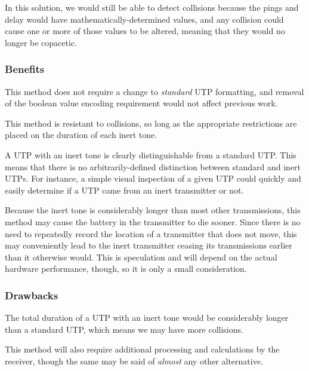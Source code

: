 \documentclass[12pt]{article}
\begin{document}
In this solution, we would still be able to detect collisions because the
pings and delay would have mathematically-determined values, and any collision
could cause one or more of those values to be altered, meaning that they
would no longer be copacetic.

\subsubsection{Benefits}

This method does not require a change to {\em standard} UTP formatting, and
removal of the boolean value encoding requirement would not affect previous
work.

This method is resistant to collisions, so long as the appropriate restrictions
are placed on the duration of each inert tone.

A UTP with an inert tone is clearly distinguishable from a standard UTP.
This means that there is no arbitrarily-defined distinction between standard
and inert UTPs.
For instance, a simple visual inspection of a given UTP could quickly and
easily determine if a UTP came from an inert transmitter or not.

Because the inert tone is considerably longer than most other transmissions,
this method may cause the battery in the transmitter to die sooner.
Since there is no need to repeatedly record the location of a transmitter that
does not move, this may conveniently lead to the inert transmitter ceasing its
transmissions earlier than it otherwise would.
This is speculation and will depend on the actual hardware performance, though,
so it is only a small consideration.

\subsubsection{Drawbacks}

The total duration of a UTP with an inert tone would be considerably longer
than a standard UTP, which means we may have more collisions.

This method will also require additional processing and calculations by the
receiver, though the same may be said of {\em almost} any other alternative.

%
\end{document}
